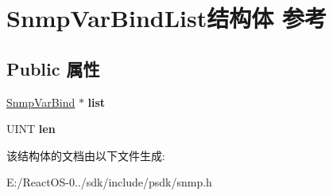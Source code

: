 \hypertarget{struct_snmp_var_bind_list}{}\section{Snmp\+Var\+Bind\+List结构体 参考}
\label{struct_snmp_var_bind_list}
\subsection*{Public 属性}
\begin{DoxyCompactItemize}
\item 
\mbox{\label{struct_snmp_var_bind_list_a8909a76bfe273fddf8aeed0f6190f047}} 
\hyperlink{struct_snmp_var_bind}{Snmp\+Var\+Bind} $\ast$ {\bfseries list}
\item 
\mbox{\label{struct_snmp_var_bind_list_ad44b43d9d33960dbec95670cd9aeb7c8}} 
U\+I\+NT {\bfseries len}
\end{DoxyCompactItemize}


该结构体的文档由以下文件生成\+:\begin{DoxyCompactItemize}
\item 
E\+:/\+React\+O\+S-\/0../sdk/include/psdk/snmp.\+h\end{DoxyCompactItemize}
